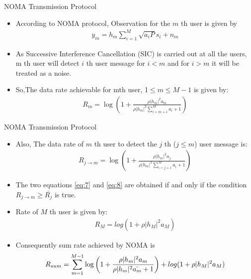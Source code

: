 \documentclass{beamer}
\providecommand{\brak}[1]{\ensuremath{\left(#1\right)}}
\providecommand{\abs}[1]{\vert#1\vert}
\begin{document}
   \begin{frame}
     \begin{block}{NOMA Transmission Protocol}
   \begin{itemize}
  \item  According to NOMA protocol, Observation for the $m$ th user is given by
   \begin{align}
       y_{m}=h_{m}\sum_{i=1}^{M}\sqrt{a_{i}P}s_{i}+n_{m}
   \end{align}
   \item As  Successive Interference Cancellation (SIC) is carried out at all the users, m th user will detect $i$ th user message for $i<m$ and for $i>m$ it will be treated as a noise.
   \item So,The data rate achievable for mth user, 1$\leq m\leq  M-1 $  is given by:
     \begin{align}
       R_{m}=\log\brak{1+\frac{\rho\abs{h_{m}}^{2} a_{m}}{\rho\abs{h_{m}}^2\sum_{i=m+1}^{M}a_{i}+1}}\label{eq:7}
   \end{align}
  \end{itemize}
  \end{block}
\end{frame}
\begin{frame}
\begin{block}{NOMA Transmission Protocol}
\begin{itemize}

 \item Also, The data rate of $m$ th user to detect the $j$ th   ($j\leq m$) user message is:
 \begin{align}
     R_{j\rightarrow m}=\log\brak{1+\frac{\rho\abs{h_{m}}^{2} a_{j}}{\rho\abs{h_{m}}^2\sum_{i=j+1}^{M}a_{i}+1}}\label{eq:8}
 \end{align}
 \item The two equations \eqref{eq:7} and \eqref{eq:8} are obtained if  and only if the condition $R_{j\rightarrow m} \geq \bar{R_j}$ is true.
   \item Rate of $M$ th user is given by:
   \begin{align}
       R_M=log(1+\rho \abs{h_M}^2 a_M)
   \end{align}
   \item Consequently sum rate achieved by NOMA is \begin{align}
       R_{sum}=\sum_{m=1}^{M-1} \log\brak{1+\frac{\rho\abs{h_{m}}^{2} a_{m}}{\rho\abs{h_{m}}^2 \Bar{a_m}+1}}+ log(1+\rho \abs{h_M}^2 a_M)
   \end{align} 
   \end{itemize}
\end{block}
\end{frame}
\end{document}
